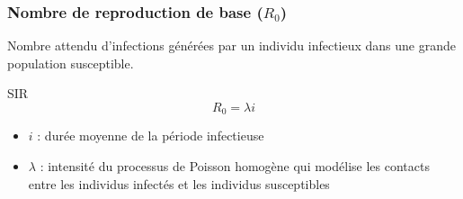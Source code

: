 \begin{frame}
        \frametitle{Nombre de reproduction de base ($R_0$)}

        Nombre attendu d’infections générées par un individu infectieux dans une grande population susceptible.

        \begin{alertblock}{SIR}
                $$ R_0 =  \lambda i $$
        \end{alertblock}

        \begin{itemize}
                \item $i$ : durée moyenne de la période infectieuse
                \item $\lambda$ : intensité du processus de Poisson homogène qui modélise les contacts entre les individus infectés et les individus susceptibles
        \end{itemize}
\end{frame}
